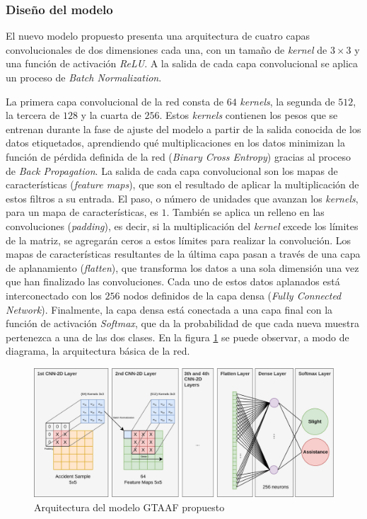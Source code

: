 \subsubsection{Diseño del modelo}

El nuevo modelo propuesto presenta una arquitectura de cuatro capas convolucionales de dos dimensiones cada una, con un tamaño de \textit{kernel} de $3 \times 3$ y una función de activación \textit{ReLU}. A la salida de cada capa convolucional se aplica un proceso de \textit{Batch Normalization}.

La primera capa convolucional de la red consta de $64$ \textit{kernels}, la segunda de $512$, la tercera de $128$ y la cuarta de $256$. Estos \textit{kernels} contienen los pesos que se entrenan durante la fase de ajuste del modelo a partir de la salida conocida de los datos etiquetados, aprendiendo qué multiplicaciones en los datos minimizan la función de pérdida definida de la red (\textit{Binary Cross Entropy}) gracias al proceso de \textit{Back Propagation}. La salida de cada capa convolucional son los mapas de características (\textit{feature maps}), que son el resultado de aplicar la multiplicación de estos filtros a su entrada. El paso, o número de unidades que avanzan los \textit{kernels}, para un mapa de características, es $1$. También se aplica un relleno en las convoluciones (\textit{padding}), es decir, si la multiplicación del \textit{kernel} excede los límites de la matriz, se agregarán ceros a estos límites para realizar la convolución. Los mapas de características resultantes de la última capa pasan a través de una capa de aplanamiento (\textit{flatten}), que transforma los datos a una sola dimensión una vez que han finalizado las convoluciones. Cada uno de estos datos aplanados está interconectado con los $256$ nodos definidos de la capa densa (\textit{Fully Connected Network}). Finalmente, la capa densa está conectada a una capa final con la función de activación \textit{Softmax}, que da la probabilidad de que cada nueva muestra pertenezca a una de las dos clases. En la figura \ref{CNN2DArchitecture} se puede observar, a modo de diagrama, la arquitectura básica de la red.

\begin{figure}[H]
	\centering
	\includegraphics[width=15cm]{Figures/SIMPLE.png}
	\caption{Arquitectura del modelo GTAAF propuesto}
	\label{CNN2DArchitecture}
\end{figure}


